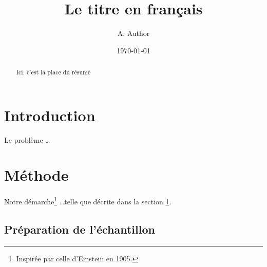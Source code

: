 \documentclass[a4paper, french]{article}
\title{Le titre en français}
\author{A. Author}
\date{\today}
\begin{document}
\maketitle

\begin{abstract}
Ici, c'est la place du résumé
\end{abstract}

\section{Introduction}
\label{sec:intro}

Le problème \ldots

\section{Méthode}
\label{sec:methode}

Notre démarche\footnote{Inspirée par celle d'Einstein en 1905.} \ldots telle que décrite dans la section \ref{sec:intro}.

\subsection{Préparation de l'échantillon}

\end{document}
